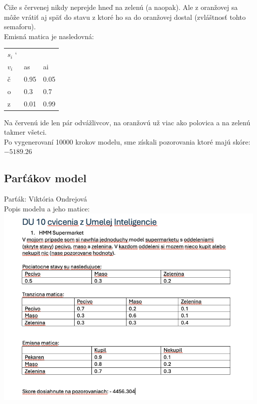 \documentclass[a4paper]{article}
\begin{document}
Čiže s červenej nikdy neprejde hneď na zelenú (a naopak). Ale z oranžovej sa môže vrátiť aj späť do stavu z ktoré ho sa do oranžovej dostal (zvláštnosť tohto semaforu).
\\

Emisná matica je nasledovná:

\begin{table}[h!]
	\begin{tabular}{|l|l|l|}
		\hline
		$s_i$ \char`\\ $v_i$ & as   & ai     \\ \hline
		č                    & 0.95 & 0.05  \\ \hline
		o                    & 0.3  & 0.7  \\ \hline
		z                    & 0.01 & 0.99  \\ \hline
	\end{tabular}
\end{table}

Na červenú ide len pár odvážlivcov, na oranžovú už viac ako polovica a na zelenú takmer všetci.
\\

Po vygenerovaní 10000 krokov modelu, sme získali pozorovania ktoré majú skóre: $-5189.26$

\newpage

\subsection*{Parťákov model}

Parťák: Viktória Ondrejová
\\

Popis modelu a jeho matice:
\\

\includegraphics[width=\textwidth]{model_viky.png}
\end{document}
